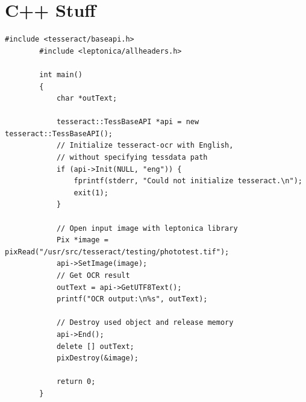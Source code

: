 \documentclass[11pt]{article}
\begin{document}
    \section{C++ Stuff}
    \begin{lstlisting}[label={lst:lstlisting}]
        #include <tesseract/baseapi.h>
        #include <leptonica/allheaders.h>

        int main()
        {
            char *outText;

            tesseract::TessBaseAPI *api = new tesseract::TessBaseAPI();
            // Initialize tesseract-ocr with English,
            // without specifying tessdata path
            if (api->Init(NULL, "eng")) {
                fprintf(stderr, "Could not initialize tesseract.\n");
                exit(1);
            }

            // Open input image with leptonica library
            Pix *image = pixRead("/usr/src/tesseract/testing/phototest.tif");
            api->SetImage(image);
            // Get OCR result
            outText = api->GetUTF8Text();
            printf("OCR output:\n%s", outText);

            // Destroy used object and release memory
            api->End();
            delete [] outText;
            pixDestroy(&image);

            return 0;
        }
    \end{lstlisting}


    
    
\end{document}
